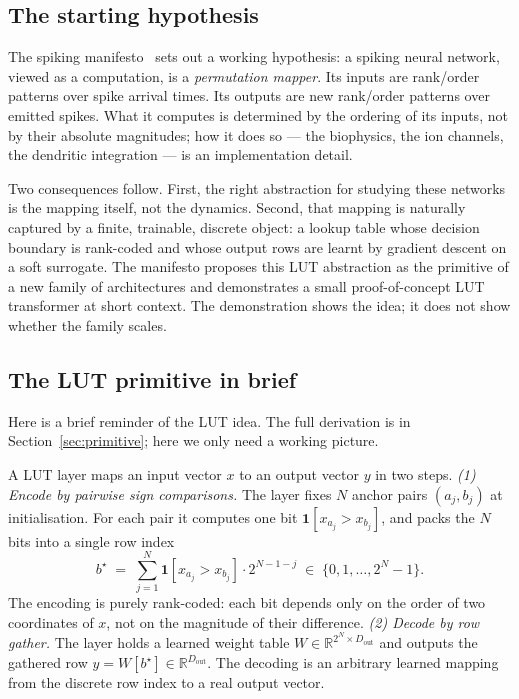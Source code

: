\documentclass[11pt]{article}
\newcommand{\R}{\mathbb{R}}
\newcommand{\dout}{D_{\mathrm{out}}}
\begin{document}
\subsection{The starting hypothesis}

The spiking manifesto~\citep{manifesto} sets out a working hypothesis: a spiking neural network, viewed as a computation, is a \emph{permutation mapper}. Its inputs are rank/order patterns over spike arrival times. Its outputs are new rank/order patterns over emitted spikes. What it computes is determined by the ordering of its inputs, not by their absolute magnitudes; how it does so --- the biophysics, the ion channels, the dendritic integration --- is an implementation detail.

Two consequences follow. First, the right abstraction for studying these networks is the mapping itself, not the dynamics. Second, that mapping is naturally captured by a finite, trainable, discrete object: a lookup table whose decision boundary is rank-coded and whose output rows are learnt by gradient descent on a soft surrogate. The manifesto proposes this LUT abstraction as the primitive of a new family of architectures and demonstrates a small proof-of-concept LUT transformer at short context. The demonstration shows the idea; it does not show whether the family scales.

\subsection{The LUT primitive in brief}
\label{ssec:lut-primer}

Here is a brief reminder of the LUT idea. The full derivation is in Section~\ref{sec:primitive}; here we only need a working picture.

A LUT layer maps an input vector $x$ to an output vector $y$ in two steps. \emph{(1) Encode by pairwise sign comparisons.} The layer fixes $N$ anchor pairs $(a_j, b_j)$ at initialisation. For each pair it computes one bit $\mathbf{1}[x_{a_j} > x_{b_j}]$, and packs the $N$ bits into a single row index
\[
b^\star \;=\; \sum_{j=1}^{N} \mathbf{1}[x_{a_j} > x_{b_j}] \cdot 2^{N-1-j} \;\in\; \{0, 1, \dots, 2^N - 1\}.
\]
The encoding is purely rank-coded: each bit depends only on the order of two coordinates of $x$, not on the magnitude of their difference. \emph{(2) Decode by row gather.} The layer holds a learned weight table $W \in \R^{2^N \times \dout}$ and outputs the gathered row $y = W[b^\star] \in \R^{\dout}$. The decoding is an arbitrary learned mapping from the discrete row index to a real output vector.
\end{document}
